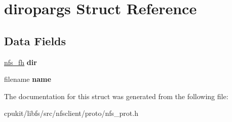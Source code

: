 \hypertarget{structdiropargs}{}\section{diropargs Struct Reference}
\label{structdiropargs}
\subsection*{Data Fields}
\begin{DoxyCompactItemize}
\item 
\mbox{\label{structdiropargs_a22497d6614b070cb1682e600a1d3cca6}} 
\mbox{\hyperlink{structnfs__fh}{nfs\+\_\+fh}} {\bfseries dir}
\item 
\mbox{\label{structdiropargs_ab3512f7a25d026363cc5eb8162f150f6}} 
filename {\bfseries name}
\end{DoxyCompactItemize}


The documentation for this struct was generated from the following file\+:\begin{DoxyCompactItemize}
\item 
cpukit/libfs/src/nfsclient/proto/nfs\+\_\+prot.\+h\end{DoxyCompactItemize}
